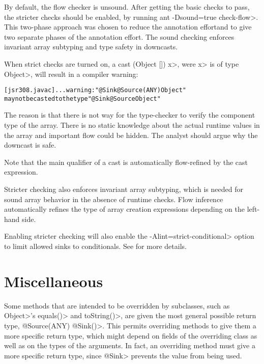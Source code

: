 By default, the flow checker is unsound.  After getting the basic checks to pass, the
 stricter checks should be enabled, by running \<ant -Dsound=true check-flow>.
This two-phase approach was chosen to reduce
the annotation effortand to give two separate phases of
the annotation effort.
 The sound checking enforces invariant 
array subtyping and type safety in downcasts.


When strict checks are turned on,
a cast \<(Object []) x>, were \<x> is of type \<Object>, will result
in a compiler warning:

\begin{alltt}
[jsr308.javac] ... warning: "@Sink @Source({ANY}) Object"
       may not be casted to the type "@Sink @Source Object"
\end{alltt}

The reason is that there is not way for the type-checker to verify
 the component type of the array. There is no static knowledge about the actual
runtime values in the array and important flow could be hidden.
The analyst should argue why the downcast is safe.

Note that the main qualifier of a cast is automatically flow-refined
by the cast expression.


\medskip

Stricter checking also enforces invariant array subtyping, which is
needed for sound array behavior in the absence of runtime checks.
Flow inference automatically refines the type of array creation
expressions depending on the left-hand side.

\medskip

Enabling stricter checking will also enable the \<-Alint=strict-conditional> option to limit 
allowed sinks to conditionals. See  for more details.

\section{Miscellaneous\label{sec:miscellaneous}}

Some methods that are intended to be overridden by subclasses, such as 
\<Object>'s \<equals()> and \<toString()>, are given the most general
possible return type, \<@Source(ANY) @Sink({})>.
This permits overriding methods to give them a more specific return type, which
might depend on fields of the overriding class as well as on the types of
the arguments.  In fact, an overriding method must give a more specific
return type, since \<@Sink> prevents the value from being used.


